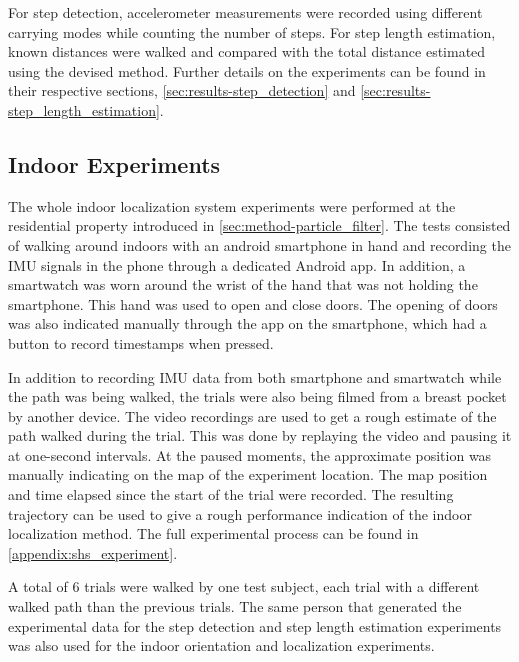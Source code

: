 For step detection, accelerometer measurements were recorded using different carrying modes while counting the number of steps. For step length estimation, known distances were walked and compared with the total distance estimated using the devised method. Further details on the experiments can be found in their respective sections, \cref{sec:results-step_detection} and \cref{sec:results-step_length_estimation}.    \par

\subsection{Indoor Experiments}
\label{sec:results-experi_setup-indoor_experi}
The whole indoor localization system experiments were performed at the residential property introduced in \cref{sec:method-particle_filter}. The tests consisted of walking around indoors with an android smartphone in hand and recording the \ac{IMU} signals in the phone through a dedicated Android app. In addition, a smartwatch was worn around the wrist of the hand that was not holding the smartphone. This hand was used to open and close doors. The opening of doors was also indicated manually through the app on the smartphone, which had a button to record timestamps when pressed.\par 

In addition to recording \ac{IMU} data from both smartphone and smartwatch while the path was being walked, the trials were also being filmed from a breast pocket by another device. The video recordings are used to get a rough estimate of the path walked during the trial. This was done by replaying the video and pausing it at one-second intervals. At the paused moments, the approximate position was manually indicating on the map of the experiment location. The map position and time elapsed since the start of the trial were recorded. The resulting trajectory can be used to give a rough performance indication of the indoor localization method. The full experimental process can be found in \cref{appendix:shs_experiment}. \par

A total of 6 trials were walked by one test subject, each trial with a different walked path than the previous trials. The same person that generated the experimental data for the step detection and step length estimation experiments was also used for the indoor orientation and localization experiments.\par 

